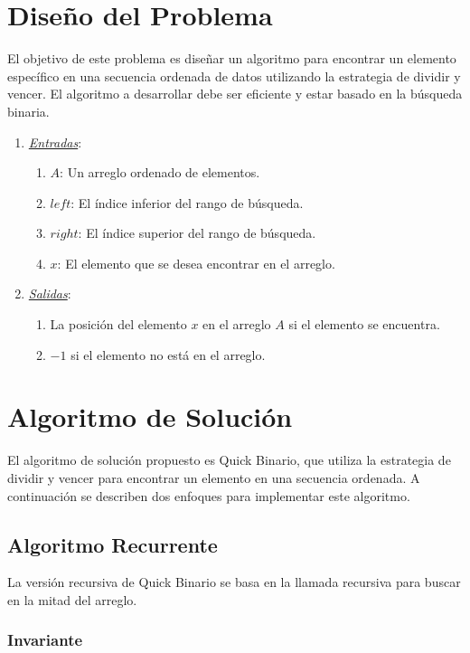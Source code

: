 \documentclass[twoside,spanish]{elsarticle}
\begin{document}
\section{Diseño del Problema}

El objetivo de este problema es diseñar un algoritmo para encontrar un elemento específico en una secuencia ordenada de datos utilizando la estrategia de dividir y vencer. El algoritmo a desarrollar debe ser eficiente y estar basado en la búsqueda binaria.

\begin{enumerate}
\item \emph{\uline{Entradas}}:
\begin{enumerate}
    \item $A$: Un arreglo ordenado de elementos.
    \item $left$: El índice inferior del rango de búsqueda.
    \item $right$: El índice superior del rango de búsqueda.
    \item $x$: El elemento que se desea encontrar en el arreglo.
\end{enumerate}
\item \emph{\uline{Salidas}}:
\begin{enumerate}
    \item La posición del elemento $x$ en el arreglo $A$ si el elemento se encuentra. 
    \item $-1$ si el elemento no está en el arreglo.
\end{enumerate}
\end{enumerate}

\section{Algoritmo de Solución}

El algoritmo de solución propuesto es Quick Binario, que utiliza la estrategia de dividir y vencer para encontrar un elemento en una secuencia ordenada. A continuación se describen dos enfoques para implementar este algoritmo.

\subsection{Algoritmo Recurrente}

La versión recursiva de Quick Binario se basa en la llamada recursiva para buscar en la mitad del arreglo.

\subsubsection{Invariante}
\end{document}
